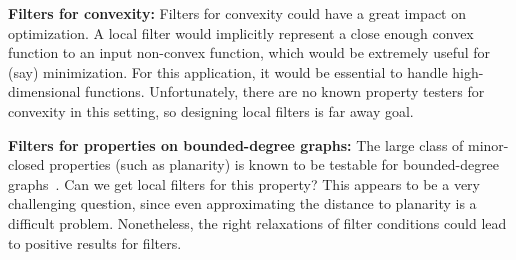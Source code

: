 \documentclass[natbib]{svcyclop}
\begin{document}
{\bf Filters for convexity:} Filters for convexity could have a great impact on optimization.
A local filter would implicitly represent a close enough convex function to an input non-convex function,
which would be extremely useful for (say) minimization. For this application, it would be essential
to handle high-dimensional functions. Unfortunately, there are no known property testers for convexity in this setting,
so designing local filters is far away goal.

{\bf Filters for properties on bounded-degree graphs:} The large class of minor-closed properties (such as planarity)
is known to be testable for bounded-degree graphs~\cite{BSS08}. Can we get local filters for this property? This appears to 
be a very challenging question, since even approximating the distance to planarity is a difficult problem.
Nonetheless, the right relaxations of filter conditions could lead to positive results for filters.



%
%
%
%


%
%
%
%
%
%


\end{document}
